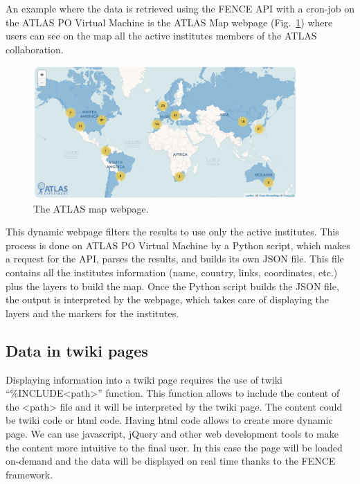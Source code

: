An example where the data is retrieved using the FENCE API with a cron-job on the ATLAS PO Virtual Machine is the ATLAS Map webpage (Fig.~\ref{fig:atlas_map_webpage}) where users can see on the map all the active institutes members of the ATLAS collaboration.
\begin{figure}[ht!]
  \centering
  \includegraphics[width=0.9\textwidth]{figures/atlas_map_webpage.png}
  \caption{The ATLAS map webpage.}
  \label{fig:atlas_map_webpage}
\end{figure}
This dynamic webpage filters the results to use only the active institutes. This process is done on ATLAS PO Virtual Machine by a Python script, which makes a request for the API, parses the results, and builds its own JSON file. This file contains all the institutes information (name, country, links, coordinates, etc.) plus the layers to build the map. Once the Python script builds the JSON file, the output is interpreted by the webpage, which takes care of displaying the layers and the markers for the institutes.

\subsection{Data in twiki pages}
\label{sec:Data_in_twiki_pages}

Displaying information into a twiki page requires the use of twiki “\%INCLUDE<path>” function. This function allows to include the content of the <path> file and it will be interpreted by the twiki page. The content could be twiki code or html code. Having html code allows to create more dynamic page. We can use javascript, jQuery and other web development tools to make the content more intuitive to the final user. In this case the page will be loaded on-demand and the data will be displayed on real time thanks to the FENCE framework.

